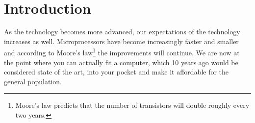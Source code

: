 \chapter{Introduction}
As the technology becomes more advanced, our expectations of the technology increases as well. Microprocessors have become increasingly faster and smaller and according to Moore's law\footnote{Moore's law predicts that the number of transistors will double roughly every two years.} the improvements will continue. We are now at the point where you can actually fit a computer, which 10 years ago would be considered state of the art, into your pocket and make it affordable for the general population.
